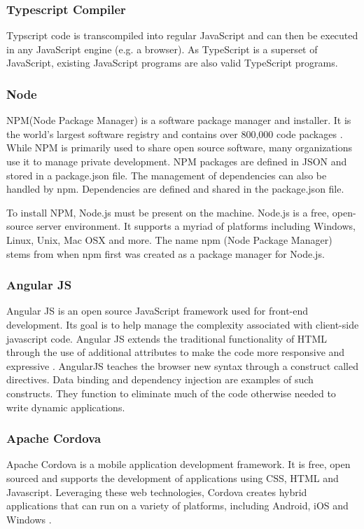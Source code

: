 \subsubsection{Typescript Compiler}
 Typscript code is transcompiled into regular JavaScript and can then be executed in any JavaScript engine (e.g. a browser). As TypeScript is a superset of JavaScript, existing JavaScript programs are also valid TypeScript programs. 

\subsubsection{Node}
NPM(Node Package Manager) is a software package manager and installer. It is the world’s largest software registry and contains over 800,000 code packages \cite{npm}. While NPM is primarily used to share open source software, many organizations use it to manage private development. NPM packages are defined in JSON and stored in a  package.json file. The management of dependencies can also be handled by npm. Dependencies are defined and shared in the package.json file. 

To install NPM, Node.js must be present on the machine. Node.js is a free, open-source server environment. It supports a myriad of platforms including Windows, Linux, Unix, Mac OSX and more.  The name npm (Node Package Manager) stems from when npm first was created as a package manager for Node.js.


\subsubsection{Angular JS}
Angular JS is an open source JavaScript framework used for front-end development. Its goal is to help manage the complexity associated with client-side javascript code. Angular JS extends the traditional functionality of HTML through the use of additional attributes to make the code more responsive and expressive \cite{angularjs}. 
 AngularJS teaches the browser new syntax through a construct called directives. Data binding and dependency injection are examples of such constructs. They function to eliminate much of the code otherwise needed to write dynamic applications.


\subsubsection{Apache Cordova}
Apache Cordova is a mobile application development framework. It is free, open sourced and supports the development of applications using CSS, HTML and Javascript. Leveraging these web technologies, Cordova creates hybrid applications that can run on a variety of platforms, including Android, iOS and Windows \cite{cordova_docs}. 

